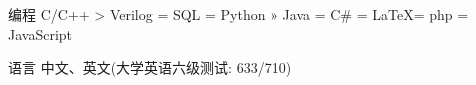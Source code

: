 

\begin{cvskills}

  \cvskill
    {\quad\quad 编程} %
    {C/C++ > Verilog = SQL = Python » Java = C\# = \LaTeX = php = JavaScript} %

  \cvskill
    {\quad\quad 语言} %
    {中文、英文(大学英语六级测试: 633/710)} %

\end{cvskills}
